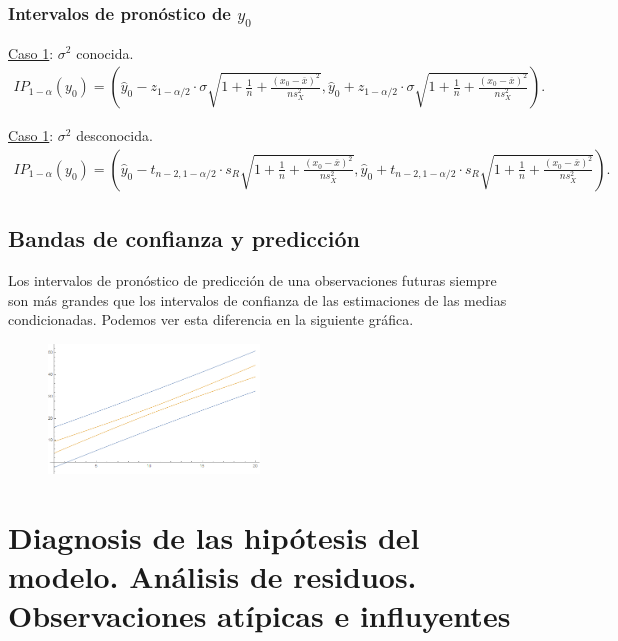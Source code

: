 \subsubsection{Intervalos de pronóstico de $y_0$}
\underline{Caso 1}: $\sigma^2$ conocida.
\begin{align*}
    IP_{1-\alpha}(y_0) = \left( \widehat{y}_0 - z_{1-\alpha/2} \cdot \sigma \sqrt{1 + \frac{1}{n} + \frac{(x_0 - \overline{x})^2}{ns_X^2}}, \widehat{y}_0 + z_{1-\alpha/2} \cdot \sigma \sqrt{1 + \frac{1}{n} + \frac{(x_0 - \overline{x})^2}{ns_X^2}}  \right).
\end{align*}

\underline{Caso 1}: $\sigma^2$ desconocida.
\begin{align*}
    IP_{1-\alpha}(y_0) = \left( \widehat{y}_0 - t_{n-2,1-\alpha/2} \cdot s_R \sqrt{1 + \frac{1}{n} + \frac{(x_0 - \overline{x})^2}{ns_X^2}}, \widehat{y}_0 + t_{n-2,1-\alpha/2} \cdot s_R \sqrt{1 + \frac{1}{n} + \frac{(x_0 - \overline{x})^2}{ns_X^2}}  \right).
\end{align*}

\subsection{Bandas de confianza y predicción}
Los intervalos de pronóstico de predicción de una observaciones futuras siempre son más grandes que los intervalos de confianza de las estimaciones de las medias condicionadas. Podemos ver esta diferencia en la siguiente gráfica.
\begin{figure}[h]
    \centering
    \includegraphics[width=0.5\textwidth]{imagenes1/bandas.png}
\end{figure}

\section{Diagnosis de las hipótesis del modelo. Análisis de residuos. Observaciones atípicas e influyentes}

